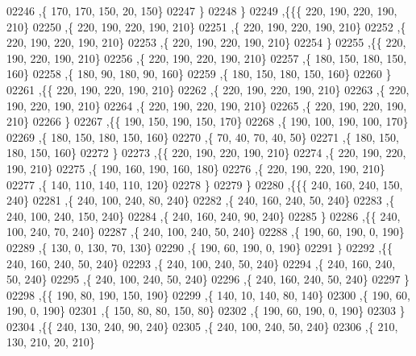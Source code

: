 \begin{DoxyCode}
02246     ,\{   170,   170,   150,    20,   150\}
02247     \}
02248    \}
02249   ,\{\{\{   220,   190,   220,   190,   210\}
02250     ,\{   220,   190,   220,   190,   210\}
02251     ,\{   220,   190,   220,   190,   210\}
02252     ,\{   220,   190,   220,   190,   210\}
02253     ,\{   220,   190,   220,   190,   210\}
02254     \}
02255    ,\{\{   220,   190,   220,   190,   210\}
02256     ,\{   220,   190,   220,   190,   210\}
02257     ,\{   180,   150,   180,   150,   160\}
02258     ,\{   180,    90,   180,    90,   160\}
02259     ,\{   180,   150,   180,   150,   160\}
02260     \}
02261    ,\{\{   220,   190,   220,   190,   210\}
02262     ,\{   220,   190,   220,   190,   210\}
02263     ,\{   220,   190,   220,   190,   210\}
02264     ,\{   220,   190,   220,   190,   210\}
02265     ,\{   220,   190,   220,   190,   210\}
02266     \}
02267    ,\{\{   190,   150,   190,   150,   170\}
02268     ,\{   190,   100,   190,   100,   170\}
02269     ,\{   180,   150,   180,   150,   160\}
02270     ,\{    70,    40,    70,    40,    50\}
02271     ,\{   180,   150,   180,   150,   160\}
02272     \}
02273    ,\{\{   220,   190,   220,   190,   210\}
02274     ,\{   220,   190,   220,   190,   210\}
02275     ,\{   190,   160,   190,   160,   180\}
02276     ,\{   220,   190,   220,   190,   210\}
02277     ,\{   140,   110,   140,   110,   120\}
02278     \}
02279    \}
02280   ,\{\{\{   240,   160,   240,   150,   240\}
02281     ,\{   240,   100,   240,    80,   240\}
02282     ,\{   240,   160,   240,    50,   240\}
02283     ,\{   240,   100,   240,   150,   240\}
02284     ,\{   240,   160,   240,    90,   240\}
02285     \}
02286    ,\{\{   240,   100,   240,    70,   240\}
02287     ,\{   240,   100,   240,    50,   240\}
02288     ,\{   190,    60,   190,     0,   190\}
02289     ,\{   130,     0,   130,    70,   130\}
02290     ,\{   190,    60,   190,     0,   190\}
02291     \}
02292    ,\{\{   240,   160,   240,    50,   240\}
02293     ,\{   240,   100,   240,    50,   240\}
02294     ,\{   240,   160,   240,    50,   240\}
02295     ,\{   240,   100,   240,    50,   240\}
02296     ,\{   240,   160,   240,    50,   240\}
02297     \}
02298    ,\{\{   190,    80,   190,   150,   190\}
02299     ,\{   140,    10,   140,    80,   140\}
02300     ,\{   190,    60,   190,     0,   190\}
02301     ,\{   150,    80,    80,   150,    80\}
02302     ,\{   190,    60,   190,     0,   190\}
02303     \}
02304    ,\{\{   240,   130,   240,    90,   240\}
02305     ,\{   240,   100,   240,    50,   240\}
02306     ,\{   210,   130,   210,    20,   210\}

\end{DoxyCode}
